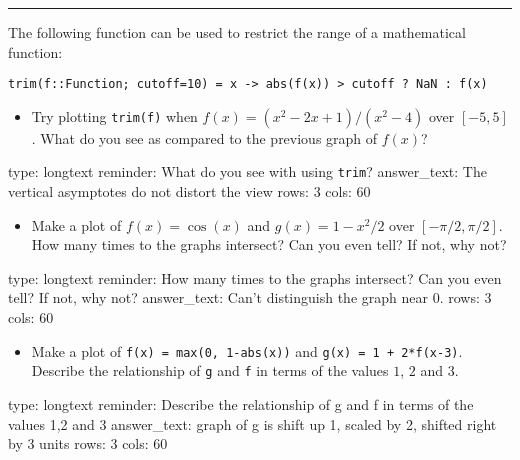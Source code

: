 \documentclass[12pt]{article}
\begin{document}
\begin{center}\rule{3in}{0.4pt}\end{center}

The following function can be used to restrict the range of a
mathematical function:



\begin{verbatim}
trim(f::Function; cutoff=10) = x -> abs(f(x)) > cutoff ? NaN : f(x)
\end{verbatim}
\begin{itemize}
\itemsep1pt\parskip0pt
\item
  Try plotting \texttt{trim(f)} when $f(x) = (x^2 - 2x + 1)/(x^2 - 4)$
  over $[-5, 5]$. What do you see as compared to the previous graph of
  $f(x)$?
\end{itemize}

\begin{answer}
type: longtext
reminder: What do you see with using \verb+trim+?
answer_text: The vertical asymptotes do not distort the view 
rows: 3
cols: 60
\end{answer}

\begin{itemize}
\itemsep1pt\parskip0pt
\item
  Make a plot of $f(x) = \cos(x)$ and $g(x) = 1 - x^2/2$ over
  $[-\pi/2, \pi/2]$. How many times to the graphs intersect? Can you
  even tell? If not, why not?
\end{itemize}

\begin{answer}
type: longtext
reminder: How many times to the graphs intersect? Can you even tell? If not, why not?
answer_text: Can't distinguish the graph near 0. 
rows: 3
cols: 60
\end{answer}

\begin{itemize}
\itemsep1pt\parskip0pt
\item
  Make a plot of \texttt{f(x) = max(0, 1-abs(x))} and
  \texttt{g(x) = 1 +   2*f(x-3)}. Describe the relationship of
  \texttt{g} and \texttt{f} in terms of the values $1$, $2$ and $3$.
\end{itemize}

\begin{answer}
type: longtext
reminder: Describe the relationship of g and f in terms of the values 1,2 and 3
answer_text: graph of g is shift up 1, scaled by 2, shifted right by 3 units 
rows: 3
cols: 60
\end{answer}
\end{document}
